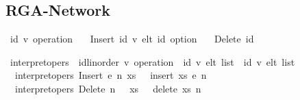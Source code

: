 \documentclass[acmlarge,review,anonymous]{acmart}\settopmatter{printfolios=true}
\begin{document}

\subsection{RGA-Network}
\label{sect.rga.network}

\begin{isabellebody}
\isanewline
{}\isamarkupfalse%
\ {\isacharparenleft}{\isacharprime}id{\isacharcomma}\ {\isacharprime}v{\isacharparenright}\ operation\ {\isacharequal}\isanewline
\ \ Insert\ {\isachardoublequoteopen}{\isacharparenleft}{\isacharprime}id{\isacharcomma}\ {\isacharprime}v{\isacharparenright}\ elt{\isachardoublequoteclose}\ {\isachardoublequoteopen}{\isacharprime}id\ option{\isachardoublequoteclose}\ {\isacharbar}\isanewline
\ \ Delete\ {\isachardoublequoteopen}{\isacharprime}id{\isachardoublequoteclose}\isanewline
\end{isabellebody}

\begin{isabellebody}
\isanewline
{}\isamarkupfalse%
\ interpret{\isacharunderscore}opers\ {\isacharcolon}{\isacharcolon}\ {\isachardoublequoteopen}{\isacharparenleft}{\isacharprime}id{\isacharcolon}{\isacharcolon}linorder{\isacharcomma}\ {\isacharprime}v{\isacharparenright}\ operation\ {\isasymRightarrow}\ {\isacharparenleft}{\isacharprime}id{\isacharcomma}\ {\isacharprime}v{\isacharparenright}\ elt\ list\ {\isasymrightharpoonup}\ {\isacharparenleft}{\isacharprime}id{\isacharcomma}\ {\isacharprime}v{\isacharparenright}\ elt\ list{\isachardoublequoteclose}\ {\isacharparenleft}{\isachardoublequoteopen}{\isasymlangle}{\isacharunderscore}{\isasymrangle}{\isachardoublequoteclose}\ {\isacharbrackleft}{}{\isacharbrackright}\ {}{}{}{}{\isacharparenright}\ \isanewline
\ \ {\isachardoublequoteopen}interpret{\isacharunderscore}opers\ {\isacharparenleft}Insert\ e\ n{\isacharparenright}\ xs\ \ {\isacharequal}\ insert\ xs\ e\ n{\isachardoublequoteclose}\ {\isacharbar}\isanewline
\ \ {\isachardoublequoteopen}interpret{\isacharunderscore}opers\ {\isacharparenleft}Delete\ n{\isacharparenright}\ \ \ xs\ \ {\isacharequal}\ delete\ xs\ n{\isachardoublequoteclose}\isanewline
\end{isabellebody}
\end{document}
